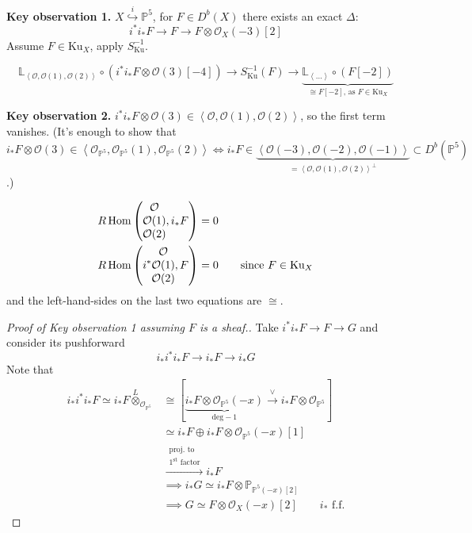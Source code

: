\medskip\noindent
{\bf Key observation 1.} 
$X\overset{i}{\hookrightarrow}\mathbb{P}^5$, for $F \in D^b(X)$
there exists an exact $\Delta$:
$$
i^*i_*F \to F \to F \otimes \mathcal{O}_X(-3)[2]
$$
Assume $F \in \text{Ku}_X$, apply $S^{-1}_{\text{Ku}}$.

$$
\mathbb{L}_{\left<\mathcal{O},\mathcal{O}(1),\mathcal{O}(2)\right>}
\circ (i^* i_* F \otimes \mathcal{O}(3)[-4]) \to S_{\text{Ku}}^{-1}(F)
\to \underbrace{\mathbb{L}_{\left<\ldots\right>}\circ(F[-2])}
_{\cong F[-2]\text{, as }F\in \text{Ku}_X}
$$

\medskip\noindent
{\bf Key observation 2.} $i^*i_*F \otimes \mathcal{O}(3) \in 
\left<\mathcal{O},\mathcal{O}(1),\mathcal{O}(2)\right>$, so the first term
vanishes. (It's enough to show that $i_*F \otimes \mathcal{O}(3) \in
\left<\mathcal{O}_{\mathbb{P}^5},\mathcal{O}_{\mathbb{P}^5}(1),
\mathcal{O}_{\mathbb{P}^5}(2)\right> 
\iff i_*F \in 
\underbrace{\left<\mathcal{O}(-3),\mathcal{O}(-2),\mathcal{O}(-1)\right>}
_{=\left<\mathcal{O},\mathcal{O}(1),\mathcal{O}(2)\right>^\perp} \subset 
D^b(\mathbb{P}^5)$.)

\begin{align*}
R\mathop{\mathrm{Hom}}\nolimits\left(
\begin{matrix}
\mathcal{O}\\ \mathcal{O}(1)\\ \mathcal{O}(2)
\end{matrix},i_*F
\right)&=0
\\
R\mathop{\mathrm{Hom}}\nolimits\left(
i^*\begin{matrix}
\mathcal{O}\\ \mathcal{O}(1)\\ \mathcal{O}(2)
\end{matrix},F
\right)&=0\qquad \text{since $F \in \text{Ku}_X$}
\end{align*}
and the left-hand-sides on the last two equations are $\cong$.

\begin{proof}[Proof of Key observation 1 assuming $F$ is a sheaf.]
Take $i^*i_*F \to F \to G$ and consider its pushforward
$$
i_*i^*i_*F \to i_* F \to i_*G
$$
Note that
\begin{align*}
i_*i^*i_*F \simeq i_*F\overset{L}{\otimes}_{\mathcal{O}_{\mathbb{P}^5}}
&\cong \left[ 
\underbrace{i_* F \otimes\mathcal{O}
_{\mathbb{P}^5}(-x)}_{\text{deg}-1} \xrightarrow{\vee}
i_*F\otimes \mathcal{O}_{\mathbb{P}^5}\right] \\
&  \simeq i_*F \oplus i_*F\otimes \mathcal{O}_{\mathbb{P}^5}(-x)[1]\\
&\xrightarrow{\substack{ \text{proj. to}\\\text{$1^{\text{st}}$ factor}}}i_*F\\
&  \implies i_*G \simeq i_* F \otimes \mathbb{P}_{\mathbb{P}^5(-x)[2]}\\
& \implies G \simeq F \otimes \mathcal{O}_X(-x)[2]\qquad i_*\text{ f.f.}
\end{align*}

\end{proof}

